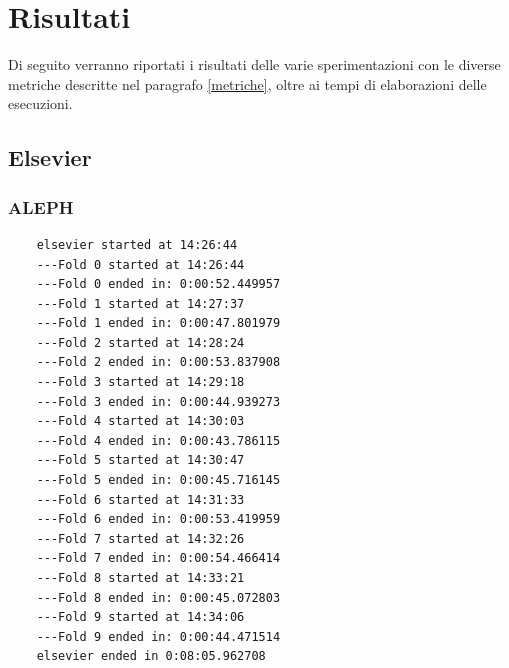 \section{Risultati}
Di seguito verranno riportati i risultati delle varie sperimentazioni con le diverse metriche descritte nel paragrafo \ref{metriche}, oltre ai tempi di elaborazioni delle esecuzioni.
\subsection{Elsevier}
\subsubsection{ALEPH}

\begin{verbatim}
	elsevier started at 14:26:44
	---Fold 0 started at 14:26:44
	---Fold 0 ended in: 0:00:52.449957
	---Fold 1 started at 14:27:37
	---Fold 1 ended in: 0:00:47.801979
	---Fold 2 started at 14:28:24
	---Fold 2 ended in: 0:00:53.837908
	---Fold 3 started at 14:29:18
	---Fold 3 ended in: 0:00:44.939273
	---Fold 4 started at 14:30:03
	---Fold 4 ended in: 0:00:43.786115
	---Fold 5 started at 14:30:47
	---Fold 5 ended in: 0:00:45.716145
	---Fold 6 started at 14:31:33
	---Fold 6 ended in: 0:00:53.419959
	---Fold 7 started at 14:32:26
	---Fold 7 ended in: 0:00:54.466414
	---Fold 8 started at 14:33:21
	---Fold 8 ended in: 0:00:45.072803
	---Fold 9 started at 14:34:06
	---Fold 9 ended in: 0:00:44.471514
	elsevier ended in 0:08:05.962708
\end{verbatim}

